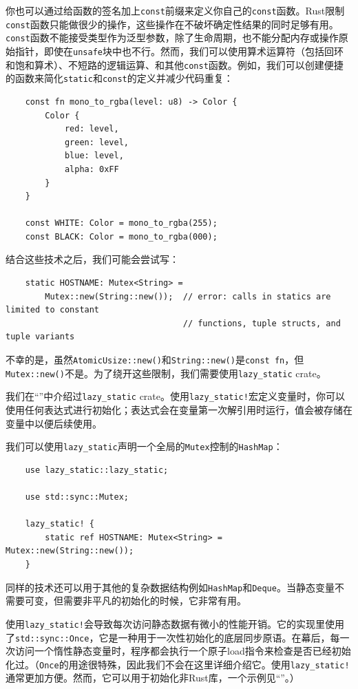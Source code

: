 你也可以通过给函数的签名加上\texttt{const}前缀来定义你自己的\texttt{const}函数。Rust限制\texttt{const}函数只能做很少的操作，这些操作在不破坏确定性结果的同时足够有用。\texttt{const}函数不能接受类型作为泛型参数，除了生命周期，也不能分配内存或操作原始指针，即使在\texttt{unsafe}块中也不行。然而，我们可以使用算术运算符（包括回环和饱和算术）、不短路的逻辑运算、和其他\texttt{const}函数。例如，我们可以创建便捷的函数来简化\texttt{static}和\texttt{const}的定义并减少代码重复：
\begin{verbatim}
    const fn mono_to_rgba(level: u8) -> Color {
        Color {
            red: level,
            green: level,
            blue: level,
            alpha: 0xFF
        }
    }

    const WHITE: Color = mono_to_rgba(255);
    const BLACK: Color = mono_to_rgba(000);
\end{verbatim}

结合这些技术之后，我们可能会尝试写：
\begin{verbatim}
    static HOSTNAME: Mutex<String> =
        Mutex::new(String::new());  // error: calls in statics are limited to constant
                                    // functions, tuple structs, and tuple variants
\end{verbatim}

不幸的是，虽然\texttt{AtomicUsize::new()}和\texttt{String::new()}是\texttt{const fn}，但\texttt{Mutex::new()}不是。为了绕开这些限制，我们需要使用\texttt{lazy\_static} crate。

我们在“”中介绍过\texttt{lazy\_static} crate。使用\texttt{lazy\_static!}宏定义变量时，你可以使用任何表达式进行初始化；表达式会在变量第一次解引用时运行，值会被存储在变量中以便后续使用。

我们可以使用\texttt{lazy\_static}声明一个全局的\texttt{Mutex}控制的\texttt{HashMap}：
\begin{verbatim}
    use lazy_static::lazy_static;

    use std::sync::Mutex;

    lazy_static! {
        static ref HOSTNAME: Mutex<String> = Mutex::new(String::new());
    }
\end{verbatim}

同样的技术还可以用于其他的复杂数据结构例如\texttt{HashMap}和\texttt{Deque}。当静态变量不需要可变，但需要非平凡的初始化的时候，它非常有用。

使用\texttt{lazy\_static!}会导致每次访问静态数据有微小的性能开销。它的实现里使用了\texttt{std::sync::Once}，它是一种用于一次性初始化的底层同步原语。在幕后，每一次访问一个惰性静态变量时，程序都会执行一个原子load指令来检查是否已经初始化过。（\texttt{Once}的用途很特殊，因此我们不会在这里详细介绍它。使用\texttt{lazy\_static!}通常更加方便。然而，它可以用于初始化非Rust库，一个示例见“”。）

\section{}
